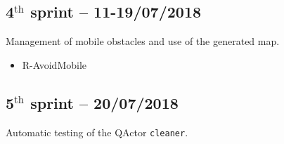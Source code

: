 \subsection{4$^{\textrm{th}}$ sprint -- 11-19/07/2018}
Management of mobile obstacles and use of the generated map.

\begin{itemize}
	\ttfamily
	\item R-AvoidMobile
\end{itemize}

\subsection{5$^{\textrm{th}}$ sprint -- 20/07/2018}
Automatic testing of the QActor \texttt{cleaner}.


